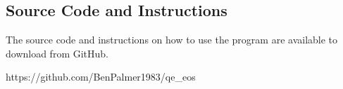 \subsection{Source Code and Instructions}

The source code and instructions on how to use the program are available to download from GitHub.

https://github.com/BenPalmer1983/qe\_eos







